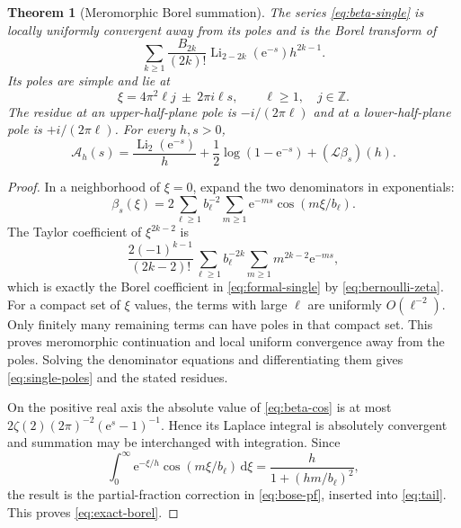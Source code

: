 \documentclass[11pt,a4paper]{article}
\numberwithin{equation}{section}
\newtheorem{theorem}{Theorem}[section]
\theoremstyle{definition}\newtheorem{definition}[theorem]{Definition}
\theoremstyle{remark}\newtheorem{remark}[theorem]{Remark}
\DeclareMathOperator{\Li}{Li}
\newcommand{\e}{\mathrm e}
\newcommand{\dd}{\,\mathrm d}
\newcommand{\calA}{\mathcal A}
\newcommand{\calL}{\mathcal L}
\begin{document}
\begin{theorem}[Meromorphic Borel summation]
\label{thm:borel}
The series \eqref{eq:beta-single} is locally uniformly convergent away from its
poles and is the Borel transform of
\begin{equation}
 \sum_{k\ge1}\frac{B_{2k}}{(2k)!}\Li_{2-2k}(\e^{-s})h^{2k-1}.
 \label{eq:formal-single}
\end{equation}
Its poles are simple and lie at
\begin{equation}
 \xi=4\pi^2\ell j\ \pm\ 2\pi i\ell s,
 \qquad \ell\ge1,\quad j\in\mathbb Z.
 \label{eq:single-poles}
\end{equation}
The residue at an upper-half-plane pole is $-i/(2\pi\ell)$ and at a
lower-half-plane pole is $+i/(2\pi\ell)$. For every $h,s>0$,
\begin{equation}
 \calA_h(s)=\frac{\Li_2(\e^{-s})}{h}
      +\frac12\log(1-\e^{-s})+(\calL\beta_s)(h).
 \label{eq:exact-borel}
\end{equation}
\end{theorem}
\begin{proof}
In a neighborhood of $\xi=0$, expand the two denominators in exponentials:
\begin{equation}
 \beta_s(\xi)=2\sum_{\ell\ge1}b_\ell^{-2}
                       \sum_{m\ge1}\e^{-ms}\cos(m\xi/b_\ell).
 \label{eq:beta-cos}
\end{equation}
The Taylor coefficient of $\xi^{2k-2}$ is
\[
 \frac{2(-1)^{k-1}}{(2k-2)!}
       \sum_{\ell\ge1}b_\ell^{-2k}
       \sum_{m\ge1}m^{2k-2}\e^{-ms},
\]
which is exactly the Borel coefficient in \eqref{eq:formal-single} by
\eqref{eq:bernoulli-zeta}. For a compact set of $\xi$ values, the terms with
large $\ell$ are uniformly $O(\ell^{-2})$. Only finitely many remaining terms
can have poles in that compact set. This proves meromorphic continuation and
local uniform convergence away from the poles. Solving the denominator equations
and differentiating them gives \eqref{eq:single-poles} and the stated residues.

On the positive real axis the absolute value of \eqref{eq:beta-cos} is at most
$2\zeta(2)(2\pi)^{-2}(\e^s-1)^{-1}$. Hence its Laplace integral is absolutely
convergent and summation may be interchanged with integration. Since
\[
 \int_0^\infty\e^{-\xi/h}\cos(m\xi/b_\ell)\dd\xi
              =\frac{h}{1+(hm/b_\ell)^2},
\]
the result is the partial-fraction correction in \eqref{eq:bose-pf}, inserted
into \eqref{eq:tail}. This proves \eqref{eq:exact-borel}.
\end{proof}
\end{document}
